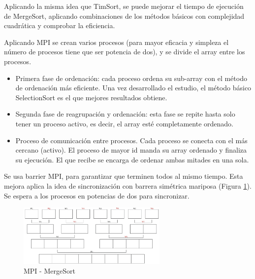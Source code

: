 Aplicando la misma idea que TimSort, se puede mejorar el tiempo de ejecución de MergeSort, aplicando combinaciones de los métodos básicos con complejidad cuadrática y comprobar la eficiencia.


Aplicando MPI se crean varios procesos (para mayor eficacia y simpleza el número de procesos tiene que ser potencia de dos), y se divide el array entre los procesos.
\begin{itemize}
	\item Primera fase de ordenación: cada proceso ordena su sub-array con el método de ordenación más eficiente. Una vez desarrollado el estudio, el método básico SelectionSort es el que mejores resultados obtiene.
	\item Segunda fase de reagrupación y ordenación: esta fase se repite hasta solo tener un proceso activo, es decir, el array esté completamente ordenado.
	\item Proceso de comunicación entre procesos. Cada proceso se conecta con el más cercano (activo). 
	El proceso de mayor id manda su array ordenado y finaliza su ejecución. El que recibe se encarga de ordenar ambas mitades en una sola.
\end{itemize}


Se usa barrier MPI, para garantizar que terminen todos al mismo tiempo. Esta mejora aplica la idea de sincronización con barrera simétrica mariposa (Figura \ref{fig:mergesortmpi}). Se espera a los procesos en potencias de dos para sincronizar.  

\begin{figure}[!h]
	\centering
	\includegraphics[width=0.65\textwidth]{images/chapter_3/mergesort_mpi}
	\caption{MPI - MergeSort}
	\label{fig:mergesortmpi}
\end{figure}

%	
%	
%	


